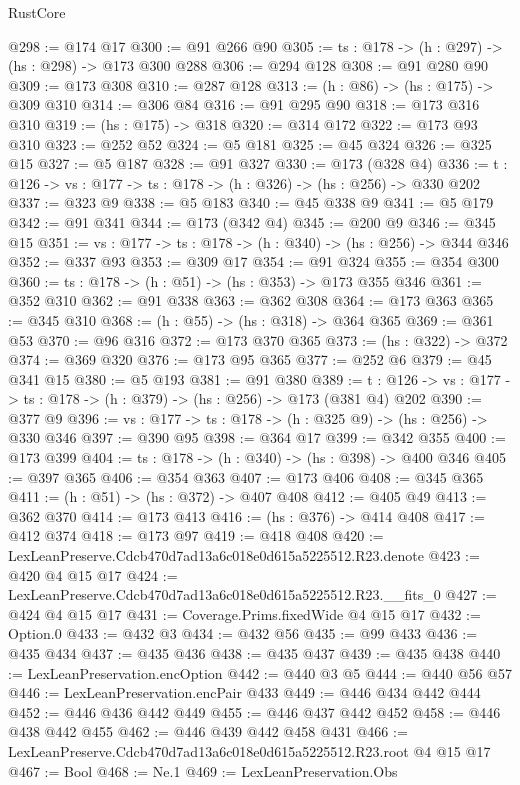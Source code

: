 \begin{lexlean}{RustCore}
\begin{coremodule}
@298 := @174 @17
@300 := @91 @266 @90
@305 := {ts : @178} -> (h : @297) -> (hs : @298) -> @173 @300 @288
@306 := @294 @128
@308 := @91 @280 @90
@309 := @173 @308
@310 := @287 @128
@313 := (h : @86) -> (hs : @175) -> @309 @310
@314 := @306 @84
@316 := @91 @295 @90
@318 := @173 @316 @310
@319 := (hs : @175) -> @318
@320 := @314 @172
@322 := @173 @93 @310
@323 := @252 @52
@324 := @5 @181
@325 := @45 @324
@326 := @325 @15
@327 := @5 @187
@328 := @91 @327
@330 := @173 (@328 @4)
@336 := {t : @126} -> {vs : @177} -> {ts : @178} -> (h : @326) -> (hs : @256) -> @330 @202
@337 := @323 @9
@338 := @5 @183
@340 := @45 @338 @9
@341 := @5 @179
@342 := @91 @341
@344 := @173 (@342 @4)
@345 := @200 @9
@346 := @345 @15
@351 := {vs : @177} -> {ts : @178} -> (h : @340) -> (hs : @256) -> @344 @346
@352 := @337 @93
@353 := @309 @17
@354 := @91 @324
@355 := @354 @300
@360 := {ts : @178} -> (h : @51) -> (hs : @353) -> @173 @355 @346
@361 := @352 @310
@362 := @91 @338
@363 := @362 @308
@364 := @173 @363
@365 := @345 @310
@368 := (h : @55) -> (hs : @318) -> @364 @365
@369 := @361 @53
@370 := @96 @316
@372 := @173 @370 @365
@373 := (hs : @322) -> @372
@374 := @369 @320
@376 := @173 @95 @365
@377 := @252 @6
@379 := @45 @341 @15
@380 := @5 @193
@381 := @91 @380
@389 := {t : @126} -> {vs : @177} -> {ts : @178} -> (h : @379) -> (hs : @256) -> @173 (@381 @4) @202
@390 := @377 @9
@396 := {vs : @177} -> {ts : @178} -> (h : @325 @9) -> (hs : @256) -> @330 @346
@397 := @390 @95
@398 := @364 @17
@399 := @342 @355
@400 := @173 @399
@404 := {ts : @178} -> (h : @340) -> (hs : @398) -> @400 @346
@405 := @397 @365
@406 := @354 @363
@407 := @173 @406
@408 := @345 @365
@411 := (h : @51) -> (hs : @372) -> @407 @408
@412 := @405 @49
@413 := @362 @370
@414 := @173 @413
@416 := (hs : @376) -> @414 @408
@417 := @412 @374
@418 := @173 @97
@419 := @418 @408
@420 := LexLeanPreserve.Cdcb470d7ad13a6c018e0d615a5225512.R23.denote
@423 := @420 @4 @15 @17
@424 := LexLeanPreserve.Cdcb470d7ad13a6c018e0d615a5225512.R23.__fits_0
@427 := @424 @4 @15 @17
@431 := Coverage.Prims.fixedWide @4 @15 @17
@432 := Option.{0}
@433 := @432 @3
@434 := @432 @56
@435 := @99 @433
@436 := @435 @434
@437 := @435 @436
@438 := @435 @437
@439 := @435 @438
@440 := LexLeanPreservation.encOption
@442 := @440 @3 @5
@444 := @440 @56 @57
@446 := LexLeanPreservation.encPair @433
@449 := @446 @434 @442 @444
@452 := @446 @436 @442 @449
@455 := @446 @437 @442 @452
@458 := @446 @438 @442 @455
@462 := @446 @439 @442 @458 @431
@466 := LexLeanPreserve.Cdcb470d7ad13a6c018e0d615a5225512.R23.root @4 @15 @17
@467 := Bool
@468 := Ne.{1}
@469 := LexLeanPreservation.Obs

\end{coremodule}
\end{lexlean}
